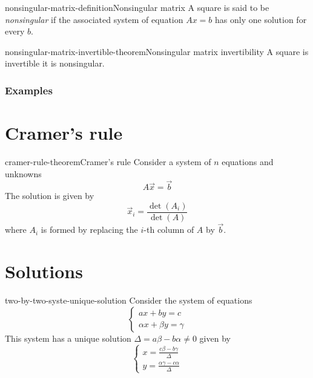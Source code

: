 \documentclass[preview]{standalone}
\begin{document}

\begin{snippetdefinition}{nonsingular-matrix-definition}{Nonsingular matrix}
    A square \matrix is said to be \emph{nonsingular} if
    the associated system of equation \(Ax = b\) has only one solution for every \(b\).
\end{snippetdefinition}

\begin{snippettheorem}{nonsingular-matrix-invertible-theorem}{Nonsingular matrix invertibility}
    A square \matrix is invertible \ifandonlyif it is nonsingular.
\end{snippettheorem}

\subsubsection{Examples}


\section{Cramer's rule}

\begin{snippettheorem}{cramer-rule-theorem}{Cramer's rule}
    Consider a system of \(n\) equations and unknowns
    \[
        A\vec{x}=\vec{b}
    \]
    The solution is given by
    \[
        \vec{x}_i = \frac{\det(A_i)}{\det(A)}
    \]
    where \(A_i\) is formed by replacing the \(i\)-th column
    of \(A\) by \(\vec{b}\).
\end{snippettheorem}

\section{Solutions}

\begin{snippetproposition}{two-by-two-syste-unique-solution}{}
    Consider the system of equations
    \[
        \begin{cases}
            ax + by = c \\
            \alpha x + \beta y = \gamma
        \end{cases}
    \]
    This system has a unique solution \ifandonlyif \(\Delta = a\beta - b\alpha \neq 0\)
    given by
    \[
        \begin{cases}
            x = \frac{c\beta - b\gamma}{\Delta} \\
            y = \frac{\alpha\gamma - c\alpha}{\Delta}
        \end{cases}
    \]
\end{snippetproposition}
\end{document}
